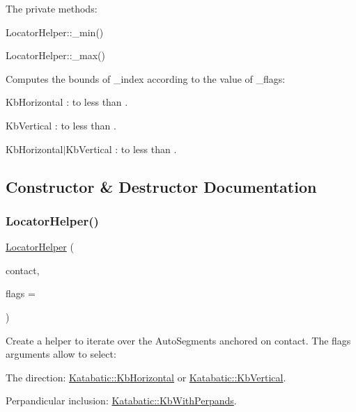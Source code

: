 The private methods\+:
\begin{DoxyItemize}
\item {\ttfamily Locator\+Helper\+::\+\_\+min()} 
\item {\ttfamily Locator\+Helper\+::\+\_\+max()} 
\end{DoxyItemize}

Computes the bounds of {\ttfamily \+\_\+index} according to the value of {\ttfamily \+\_\+flags\+:} 
\begin{DoxyItemize}
\item {\ttfamily Kb\+Horizontal} \+: {} to less than {}.
\item {\ttfamily Kb\+Vertical} \+: {} to less than {}.
\item {\ttfamily Kb\+Horizontal$\vert$\+Kb\+Vertical} \+: {} to less than {}. 
\end{DoxyItemize}

\subsection{Constructor \& Destructor Documentation}
\mbox{\label{classKatabatic_1_1LocatorHelper_af44c2fcc73d387e3e3b5c334f25b070b}} 
\subsubsection{\texorpdfstring{Locator\+Helper()}{LocatorHelper()}}
{\footnotesize\ttfamily \hyperlink{classKatabatic_1_1LocatorHelper}{Locator\+Helper} (\begin{DoxyParamCaption}\item[{\hyperlink{classKatabatic_1_1AutoContact}{Auto\+Contact} $\ast$}]{contact,  }\item[{unsigned int}]{flags = {} }\end{DoxyParamCaption})\hspace{0.3cm}{\ttfamily [inline]}}

Create a helper to iterate over the Auto\+Segments anchored on {\ttfamily contact}. The {\ttfamily flags} arguments allow to select\+:
\begin{DoxyItemize}
\item The direction\+: \hyperlink{namespaceKatabatic_a2af2ad6b6441614038caf59d04b3b217a1a9045673c5d3c30b067100f1440ae1b}{Katabatic\+::\+Kb\+Horizontal} or \hyperlink{namespaceKatabatic_a2af2ad6b6441614038caf59d04b3b217a284cad95203a27172838b09e396e3590}{Katabatic\+::\+Kb\+Vertical}.
\item Perpandicular inclusion\+: \hyperlink{namespaceKatabatic_a2af2ad6b6441614038caf59d04b3b217ae2d033c8f78b61468c827de8db5fe839}{Katabatic\+::\+Kb\+With\+Perpands}.
\end{DoxyItemize}

